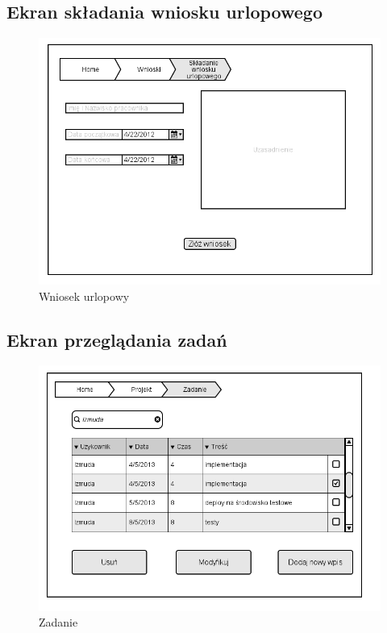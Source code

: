 \subsection{Ekran składania wniosku urlopowego}
\begin{figure}[H]
    \centering
    \includegraphics[scale=0.7]{diagramy/intefejsy/Wniosek_urlopowy.png}
    \caption{Wniosek urlopowy}
    \label{fig:usecase}
\end{figure}

\subsection{Ekran przeglądania zadań}
\begin{figure}[H]
    \centering
    \includegraphics[scale=0.7]{diagramy/intefejsy/Zadanie.png}
    \caption{Zadanie}
    \label{fig:usecase}
\end{figure}